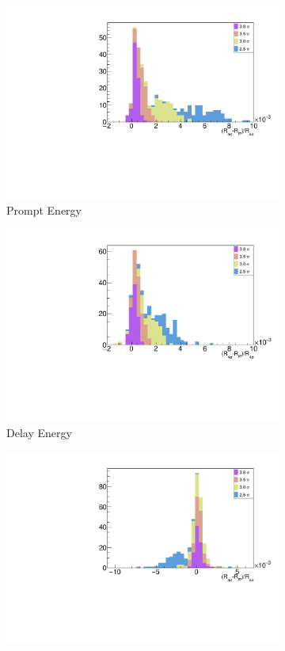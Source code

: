 \begin{figure}[H]
	\begin{subfigure}{0.5\linewidth}
		\centering
		\includegraphics[width=0.85\linewidth]{tex/6-ac227-images/Systematics_Cuts/ResidVsCell_PromptECut}
		\caption{Prompt Energy}
	\end{subfigure}
	\begin{subfigure}{0.5\linewidth}
		\centering
		\includegraphics[width=0.85\linewidth]{tex/6-ac227-images/Systematics_Cuts/ResidVsCell_DelayECut}
		\caption{Delay Energy}
	\end{subfigure}
	\begin{subfigure}{0.5\linewidth}
		\centering
		\includegraphics[width=0.85\linewidth]{tex/6-ac227-images/Systematics_Cuts/ResidVsCell_PromptPSDCut}

\end{subfigure}
\end{figure}
